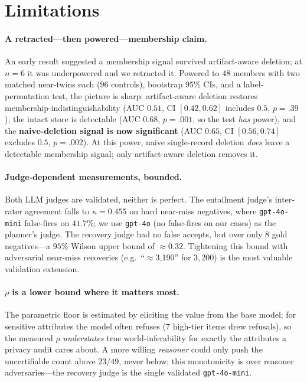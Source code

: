 \documentclass[10pt,twocolumn,letterpaper]{article}
\theoremstyle{definition}
\theoremstyle{plain}
\newcommand{\code}[1]{\texttt{#1}}
\begin{document}
\section{Limitations}\label{sec:limitations}

\paragraph{A retracted---then powered---membership claim.}
An early result suggested a membership signal survived artifact-aware deletion; at
$n{=}6$ it was underpowered and we retracted it. Powered to $48$ members with two
matched near-twins each ($96$ controls), bootstrap $95\%$ CIs, and a
label-permutation test, the picture is sharp: artifact-aware deletion restores
membership-indistinguishability (AUC $0.51$, CI $[0.42,0.62]$ includes $0.5$,
$p{=}.39$), the intact store is detectable (AUC $0.68$, $p{=}.001$, so the test
\emph{has} power), and the \textbf{naive-deletion signal is now significant} (AUC
$0.65$, CI $[0.56,0.74]$ excludes $0.5$, $p{=}.002$). At this power, naive
single-record deletion \emph{does} leave a detectable membership signal; only
artifact-aware deletion removes it.

\paragraph{Judge-dependent measurements, bounded.}
Both LLM judges are validated, neither is perfect. The entailment judge's
inter-rater agreement falls to $\kappa{=}0.455$ on hard near-miss negatives, where
\code{gpt-4o-mini} false-fires on $41.7\%$; we use \code{gpt-4o} (no false-fires on
our cases) as the planner's judge. The recovery judge had no false accepts, but
over only $8$ gold negatives---a $95\%$ Wilson upper bound of $\approx0.32$.
Tightening this bound with adversarial near-miss recoveries (e.g.\ ``$\approx$3,190''
for $3{,}200$) is the most valuable validation extension.

\paragraph{$\rho$ is a lower bound where it matters most.}
The parametric floor is estimated by eliciting the value from the base model; for
sensitive attributes the model often refuses ($7$ high-tier items drew refusals), so the measured $\rho$
\emph{understates} true world-inferability for exactly the attributes a privacy
audit cares about. A more willing \emph{reasoner} could only push the uncertifiable count
above $23/49$, never below; this monotonicity is over reasoner adversaries---the
recovery judge is the single validated \texttt{gpt-4o-mini}.
\end{document}
